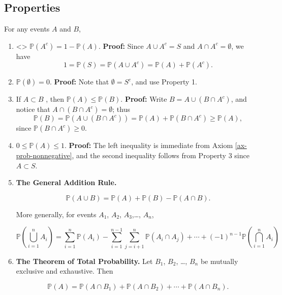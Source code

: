 \documentclass[]{book}
\providecommand{\tightlist}{%
  \setlength{\itemsep}{0pt}\setlength{\parskip}{0pt}}
\numberwithin{equation}{chapter}
\numberwithin{figure}{chapter}
\theoremstyle{plain}
\theoremstyle{definition}
\theoremstyle{remark}
\theoremstyle{definition}
\theoremstyle{definition}
\theoremstyle{remark}
\begin{document}
\subsection{Properties}\label{properties}

For any events \(A\) and \(B\),

\begin{enumerate}
\def\labelenumi{\arabic{enumi}.}
\tightlist
\item
  \textless{}\textgreater{} \(\mathbb{P}(A^{c})=1-\mathbb{P}(A)\).
  \textbf{Proof:} Since \(A\cup A^{c}=S\) and \(A\cap A^{c}=\emptyset\),
  we have \[
     1=\mathbb{P}(S)=\mathbb{P}(A\cup A^{c})=\mathbb{P}(A)+\mathbb{P}(A^{c}).
     \]
\item
  \(\mathbb{P}(\emptyset)=0\). \textbf{Proof:} Note that
  \(\emptyset=S^{c}\), and use Property 1.
\item
  If \(A\subset B\) , then \(\mathbb{P}(A)\leq\mathbb{P}(B)\).
  \textbf{Proof:} Write \(B=A\cup\left(B\cap A^{c}\right)\), and notice
  that \(A\cap\left(B\cap A^{c}\right)=\emptyset\); thus \[
     \mathbb{P}(B)=\mathbb{P}(A\cup\left(B\cap A^{c}\right))=\mathbb{P}(A)+\mathbb{P}\left(B\cap A^{c}\right)\geq\mathbb{P}(A),
     \] since \(\mathbb{P}\left(B\cap A^{c}\right)\ge0\).
\item
  \(0\leq\mathbb{P}(A)\leq1\). \textbf{Proof:} The left inequality is
  immediate from Axiom \ref{ax-prob-nonnegative}, and the second
  inequality follows from Property 3 since \(A\subset S\).
\item
  \textbf{The General Addition Rule.}

  \begin{equation}
     \label{eq-general-addition-rule-1}
     \mathbb{P}(A\cup B)=\mathbb{P}(A)+\mathbb{P}(B)-\mathbb{P}(A\cap B).
     \end{equation}

  More generally, for events \(A_{1}\), \(A_{2}\), \(A_{3}\),\ldots{},
  \(A_{n}\),

  \begin{equation}
     \mathbb{P}\left(\bigcup_{i=1}^{n}A_{i}\right)=\sum_{i=1}^{n}\mathbb{P}(A_{i})-\sum_{i=1}^{n-1}\sum_{j=i+1}^{n}\mathbb{P}(A_{i}\cap A_{j})+\cdots+(-1)^{n-1}\mathbb{P}\left(\bigcap_{i=1}^{n}A_{i}\right)
     \end{equation}
\item
  \textbf{The Theorem of Total Probability.} Let \(B_{1}\), \(B_{2}\),
  \ldots{}, \(B_{n}\) be mutually exclusive and exhaustive. Then

  \begin{equation}
     \label{eq-theorem-total-probability}
     \mathbb{P}(A)=\mathbb{P}(A\cap B_{1})+\mathbb{P}(A\cap B_{2})+\cdots+\mathbb{P}(A\cap B_{n}).
     \end{equation}
\end{enumerate}
\end{document}
